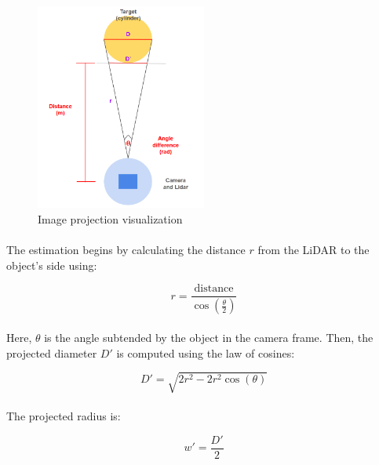 \begin{figure}[H]
    \centering
    \includegraphics[width=0.5\textwidth]{assets/images/object_detection/fig2.png}
    \caption{Image projection visualization}
    \label{fig:projection_diagram}
\end{figure}

\paragraph*{}
The estimation begins by calculating the distance \( r \) from the LiDAR to the object’s side using:

\begin{equation}
r = \frac{\text{distance}}{\cos\left(\frac{\theta}{2}\right)}
\label{eq:r}
\end{equation}

\paragraph*{}
Here, \( \theta \) is the angle subtended by the object in the camera frame. Then, the projected diameter \( D' \) is computed using the law of cosines:

\begin{equation}
D' = \sqrt{2r^2 - 2r^2 \cos(\theta)}
\label{eq:Dprime}
\end{equation}

\paragraph*{}
The projected radius is:

\begin{equation}
w' = \frac{D'}{2}
\label{eq:wprime}
\end{equation}

